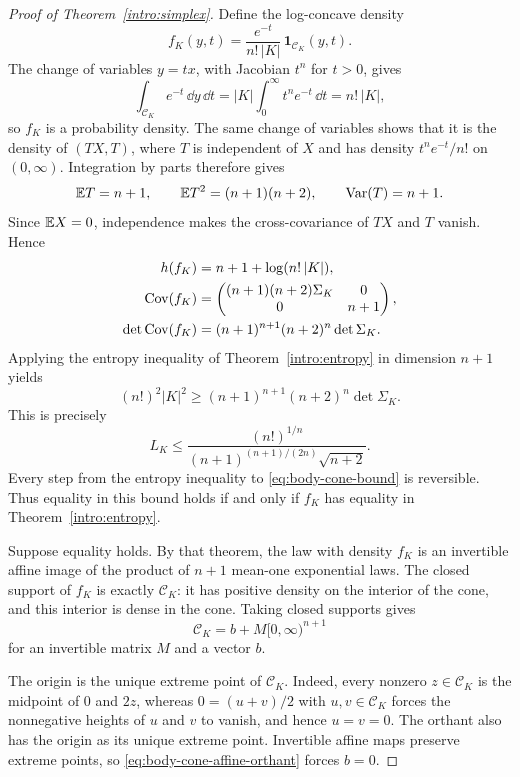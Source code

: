 \begin{proof}[Proof of Theorem~\ref{intro:simplex}]
Define the log-concave density
\begin{equation}\label{eq:body-cone-density}
  f_K(y,t)=\frac{e^{-t}}{n!\,|K|}\,
  \mathbf 1_{\mathcal C_K}(y,t).
\end{equation}
The change of variables $y=tx$, with Jacobian $t^n$ for $t>0$, gives
\[
  \int_{\mathcal C_K}e^{-t}\,\dd y\,\dd t
  =|K|\int_0^\infty t^ne^{-t}\,\dd t=n!\,|K|,
\]
so $f_K$ is a probability density.  The same change of variables shows
that it is the density of $(TX,T)$, where $T$ is independent of $X$
and has density $t^ne^{-t}/n!$ on $(0,\infty)$.  Integration by parts
therefore gives
\[
  \mathbb E T=n+1,\qquad
  \mathbb E T^2=(n+1)(n+2),\qquad
  \operatorname{Var}(T)=n+1.
\]
Since $\mathbb E X=0$, independence makes the cross-covariance of $TX$ and
$T$ vanish.  Hence
\begin{align}
  h(f_K)&=n+1+\log(n!\,|K|),\label{eq:body-cone-entropy}\\
  \operatorname{Cov}(f_K)&=
  \begin{pmatrix}
    (n+1)(n+2)\Sigma_K&0\\
    0&n+1
  \end{pmatrix},\label{eq:body-cone-covariance}\\
  \det\operatorname{Cov}(f_K)&=(n+1)^{n+1}(n+2)^n\det\Sigma_K.
  \label{eq:body-cone-determinant}
\end{align}
Applying the entropy inequality of Theorem~\ref{intro:entropy} in
dimension $n+1$ yields
\begin{equation}\label{eq:body-cone-bound}
  (n!)^2|K|^2\geq
  (n+1)^{n+1}(n+2)^n\det\Sigma_K.
\end{equation}
This is precisely
\[
  L_K\leq
  \frac{(n!)^{1/n}}{(n+1)^{(n+1)/(2n)}\sqrt{n+2}}.
\]
Every step from the entropy inequality to \eqref{eq:body-cone-bound}
is reversible.  Thus equality in this bound holds if and only if
$f_K$ has equality in Theorem~\ref{intro:entropy}.

Suppose equality holds.  By that theorem, the law with density $f_K$
is an invertible affine image of the product of $n+1$ mean-one
exponential laws.  The closed support of $f_K$ is exactly
$\mathcal C_K$: it has positive density on the interior of the cone,
and this interior is dense in the cone.  Taking closed supports gives
\begin{equation}\label{eq:body-cone-affine-orthant}
  \mathcal C_K=b+M[0,\infty)^{n+1}
\end{equation}
for an invertible matrix $M$ and a vector $b$.

The origin is the unique extreme point of $\mathcal C_K$.  Indeed,
every nonzero $z\in\mathcal C_K$ is the midpoint of $0$ and $2z$,
whereas $0=(u+v)/2$ with $u,v\in\mathcal C_K$ forces the
nonnegative heights of $u$ and $v$ to vanish, and hence $u=v=0$.
The orthant also has the origin as its unique extreme point.
Invertible affine maps preserve extreme points, so
\eqref{eq:body-cone-affine-orthant} forces $b=0$.


\end{proof}
